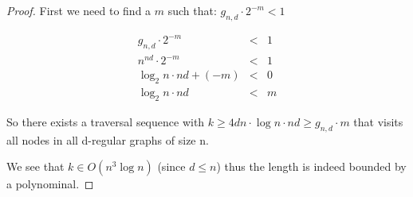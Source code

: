 \begin{proof}

First we need to find a $m$ such that: $g_{n, d} \cdot 2^{-m} < 1$

$$
\begin{array}{rcl}
    g_{n, d} \cdot 2^{-m} & < & 1 \\
    n^{nd} \cdot 2^{-m} & < & 1 \\
    \log_2 n \cdot n d + (-m) & < & 0 \\
    \log_2 n \cdot n d & < & m
\end{array}
$$

So there exists a traversal sequence with $k \geq 4dn \cdot \log n \cdot n d \geq g_{n, d} \cdot m$ that visits all nodes in all d-regular graphs of size n.

We see that $k \in O(n^3 \log n)$ (since $d \leq n$) thus the length is indeed bounded by a polynominal.

\end{proof}




